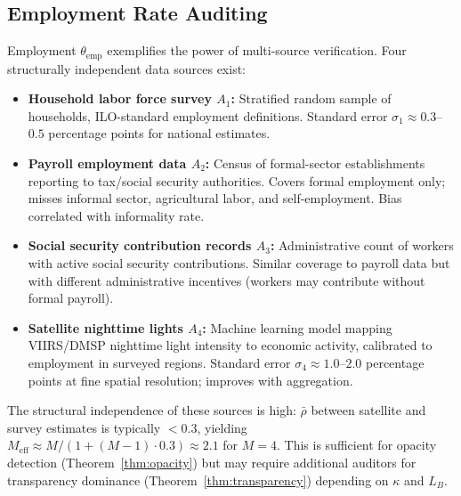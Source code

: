 \documentclass[11pt,a4paper]{article}
\theoremstyle{definition}
\begin{document}
\subsection{Employment Rate Auditing}
Employment $\theta_{\mathrm{emp}}$ exemplifies the power of multi-source verification. Four structurally independent data sources exist:
\begin{itemize}
    \item \textbf{Household labor force survey $A_1$:} Stratified random sample of households, ILO-standard employment definitions. Standard error $\sigma_1 \approx 0.3$--$0.5$ percentage points for national estimates.
    \item \textbf{Payroll employment data $A_2$:} Census of formal-sector establishments reporting to tax/social security authorities. Covers formal employment only; misses informal sector, agricultural labor, and self-employment. Bias correlated with informality rate.
    \item \textbf{Social security contribution records $A_3$:} Administrative count of workers with active social security contributions. Similar coverage to payroll data but with different administrative incentives (workers may contribute without formal payroll).
    \item \textbf{Satellite nighttime lights $A_4$:} Machine learning model mapping VIIRS/DMSP nighttime light intensity to economic activity, calibrated to employment in surveyed regions. Standard error $\sigma_4 \approx 1.0$--$2.0$ percentage points at fine spatial resolution; improves with aggregation.
\end{itemize}
The structural independence of these sources is high: $\bar{\rho}$ between satellite and survey estimates is typically $< 0.3$, yielding $M_{\mathrm{eff}} \approx M / (1 + (M-1) \cdot 0.3) \approx 2.1$ for $M = 4$. This is sufficient for opacity detection (Theorem~\ref{thm:opacity}) but may require additional auditors for transparency dominance (Theorem~\ref{thm:transparency}) depending on $\kappa$ and $L_B$.
\end{document}
